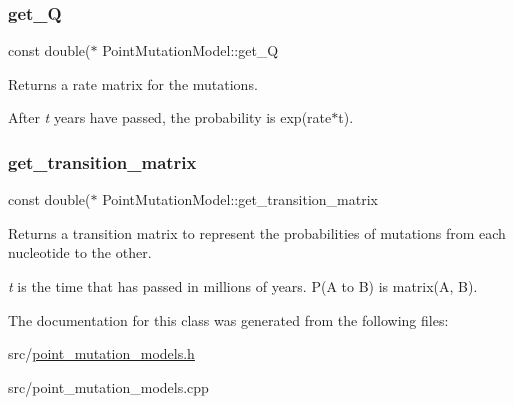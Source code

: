 \subsubsection{\texorpdfstring{get\+\_\+Q}{get\_Q}}
{\footnotesize\ttfamily const double($\ast$ Point\+Mutation\+Model\+::get\+\_\+Q}



Returns a rate matrix for the mutations. 

After {\itshape t} years have passed, the probability is exp(rate$\ast$t). \mbox{\label{classretrocombinator_1_1PointMutationModel_a5f17e2f93b22723721a4d04ac2c77aaa}} 
\subsubsection{\texorpdfstring{get\+\_\+transition\+\_\+matrix}{get\_transition\_matrix}}
{\footnotesize\ttfamily const double($\ast$ Point\+Mutation\+Model\+::get\+\_\+transition\+\_\+matrix}



Returns a transition matrix to represent the probabilities of mutations from each nucleotide to the other. 

{\itshape t} is the time that has passed in millions of years. P(\+A to B) is matrix(\+A, B). 

The documentation for this class was generated from the following files\+:\begin{DoxyCompactItemize}
\item 
src/\hyperlink{point__mutation__models_8h}{point\+\_\+mutation\+\_\+models.\+h}\item 
src/point\+\_\+mutation\+\_\+models.\+cpp\end{DoxyCompactItemize}
